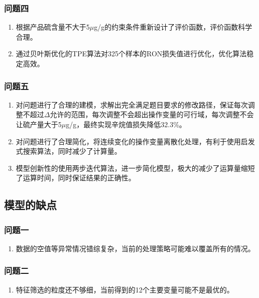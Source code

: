 \documentclass[bwprint]{gmcmthesis}
\begin{document}
\FloatBarrier
\subsubsection{问题四}
\begin{enumerate}[itemindent=20pt]
    \item 根据产品硫含量不大于5$\mu$g/g的约束条件重新设计了评价函数，评价函数科学合理。
    \item 通过贝叶斯优化的TPE算法对325个样本的RON损失值进行优化，优化算法稳定高效。
\end{enumerate}

\FloatBarrier
\subsubsection{问题五}
\begin{enumerate}[itemindent=20pt]
    \item 对问题进行了合理的建模，求解出完全满足题目要求的修改路径，保证每次调整不超过$\Delta$允许的范围，每次调整不会超出操作变量的可行域，每次调整不会让硫产量大于5$\mu$g/g，最终实现辛烷值损失降低32.3\%。
    \item 对问题进行了合理简化，将连续变化的操作变量离散化处理，有利于使用启发式搜索算法，同时减少了计算量。
    \item 模型创新性的使用两步迭代算法，进一步简化模型，极大的减少了运算量缩短了运算时间，同时保证结果的正确性。
\end{enumerate}


\FloatBarrier
\subsection{模型的缺点}

\FloatBarrier
\subsubsection{问题一}
\begin{enumerate}[itemindent=20pt]
    \item 数据的空值等异常情况错综复杂，当前的处理策略可能难以覆盖所有的情况。
\end{enumerate}

\FloatBarrier
\subsubsection{问题二}
\begin{enumerate}[itemindent=20pt]
    \item 特征筛选的粒度还不够细，当前得到的12个主要变量可能不是最优的。
\end{enumerate}
\end{document}
